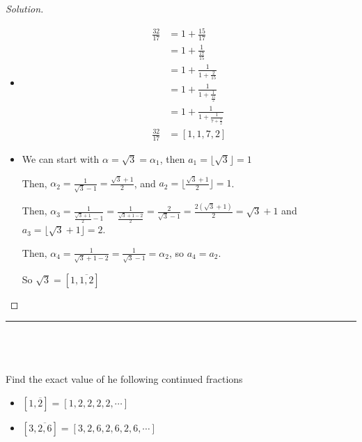 \documentclass[11pt]{article}
\newenvironment{myproblem}[1][Problem]{\begin{trivlist}
    \item[\hskip \labelsep {\bfseries #1.}]}{\end{trivlist}}
\newenvironment{solution}
  {\renewcommand\qedsymbol{$~$}\begin{proof}[Solution]$ $\par\nobreak\ignorespaces}
  {\end{proof}}
\begin{document}
\begin{solution}
  \begin{itemize}
    \item [(a)]
          \begin{align*}
            \frac{32}{17} & = 1+ \frac{15}{17}                          \\
                          & = 1 + \frac{1}{\frac{17}{15}}               \\
                          & = 1 + \frac{1}{1 + \frac{2}{15}}            \\
                          & = 1 + \frac{1}{1 + \frac{1}{\frac{15}{2}}}  \\
                          & = 1 + \frac{1}{1 + \frac{1}{7+\frac{1}{2}}} \\
            \frac{32}{17} & = [1,1,7,2]
          \end{align*}
    \item [(b)]
          We can start with $\alpha=\sqrt{3}=\alpha_1$, then $a_1=\lfloor \sqrt{3}\rfloor = 1$

          Then, $\alpha_2=\frac{1}{\sqrt{3}-1} = \frac{\sqrt{3}+1}{2}$, and $a_2=\lfloor\frac{\sqrt{3}+1}{2}\rfloor = 1$.


          Then, $\alpha_3 = \frac{1}{\frac{\sqrt{3}+1}{2} -1 }=\frac{1}{\frac{\sqrt{3}+1-2}{2}}=\frac{2}{\sqrt{3}-1} = \frac{2(\sqrt{3}+1)}{2}= \sqrt{3}+1$ and $a_3=\lfloor \sqrt{3}+1\rfloor = 2$.

          Then, $\alpha_4 = \frac{1}{\sqrt{3}+1-2} =\frac{1}{\sqrt{3}-1}=\alpha_2$, so $a_4=a_2$.

          So $\sqrt{3} =[1,\overline{1,2}]$
  \end{itemize}
\end{solution}


\hrule
~\newline

\section{}

\begin{myproblem}
  Find the exact value of he following continued fractions
  \begin{itemize}
    \item [(a)] $ [1,\overline{2} ] = [ 1,2,2,2,2,\cdots ] $
    \item [(b)] $ [3,\overline{2,6}] = [3,2,6,2,6,2,6,\cdots] $
  \end{itemize}
\end{myproblem}
\end{document}
